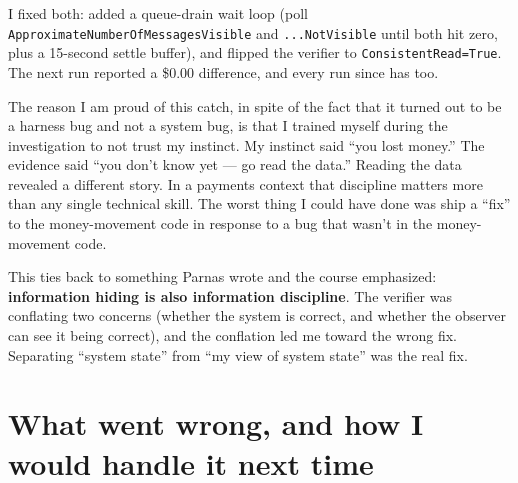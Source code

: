 \documentclass[11pt,a4paper]{article}
\begin{document}
I fixed both: added a queue-drain wait loop (poll \texttt{ApproximateNumberOfMessagesVisible} and \texttt{...NotVisible} until both hit zero, plus a 15-second settle buffer), and flipped the verifier to \texttt{ConsistentRead=True}. The next run reported a \$0.00 difference, and every run since has too.

\begin{insightbox}
The reason I am proud of this catch, in spite of the fact that it turned out to be a harness bug and not a system bug, is that I trained myself during the investigation to not trust my instinct. My instinct said ``you lost money.'' The evidence said ``you don't know yet --- go read the data.'' Reading the data revealed a different story. In a payments context that discipline matters more than any single technical skill. The worst thing I could have done was ship a ``fix'' to the money-movement code in response to a bug that wasn't in the money-movement code.
\end{insightbox}

This ties back to something Parnas wrote and the course emphasized: \textbf{information hiding is also information discipline}. The verifier was conflating two concerns (whether the system is correct, and whether the observer can see it being correct), and the conflation led me toward the wrong fix. Separating ``system state'' from ``my view of system state'' was the real fix.

\section{What went wrong, and how I would handle it next time}
\end{document}

